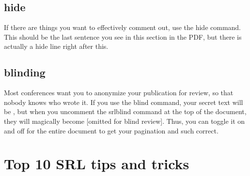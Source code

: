 \documentclass{sigchi}
\begin{document}
\subsection{hide}
If there are things you want to effectively comment out, use the hide command.
This should be the last sentence you see in this section in the PDF, but there is actually a hide line right after this.

\subsection{blinding}
Most conferences want you to anonymize your publication for review, so that nobody knows who wrote it.
If you use the blind command, your secret text will be , but when you uncomment the srlblind command at the top of the document, they will magically become [omitted for blind review].
Thus, you can toggle it on and off for the entire document to get your pagination and such correct.

\section{Top 10 SRL tips and tricks}
\end{document}
